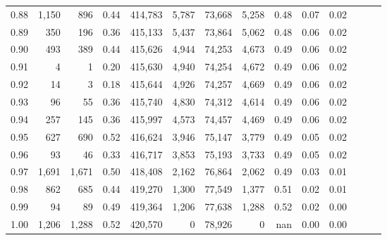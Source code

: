 \begin{tabular}{rrrrrrrrrrrrrr}
0.88 &   1,150 &    896 &  0.44 &  414,783 &    5,787 &  73,668 &   5,258 &  0.48 &  0.07 &      0.02 \\
0.89 &     350 &    196 &  0.36 &  415,133 &    5,437 &  73,864 &   5,062 &  0.48 &  0.06 &      0.02 \\
0.90 &     493 &    389 &  0.44 &  415,626 &    4,944 &  74,253 &   4,673 &  0.49 &  0.06 &      0.02 \\
0.91 &       4 &      1 &  0.20 &  415,630 &    4,940 &  74,254 &   4,672 &  0.49 &  0.06 &      0.02 \\
0.92 &      14 &      3 &  0.18 &  415,644 &    4,926 &  74,257 &   4,669 &  0.49 &  0.06 &      0.02 \\
0.93 &      96 &     55 &  0.36 &  415,740 &    4,830 &  74,312 &   4,614 &  0.49 &  0.06 &      0.02 \\
0.94 &     257 &    145 &  0.36 &  415,997 &    4,573 &  74,457 &   4,469 &  0.49 &  0.06 &      0.02 \\
0.95 &     627 &    690 &  0.52 &  416,624 &    3,946 &  75,147 &   3,779 &  0.49 &  0.05 &      0.02 \\
0.96 &      93 &     46 &  0.33 &  416,717 &    3,853 &  75,193 &   3,733 &  0.49 &  0.05 &      0.02 \\
0.97 &   1,691 &  1,671 &  0.50 &  418,408 &    2,162 &  76,864 &   2,062 &  0.49 &  0.03 &      0.01 \\
0.98 &     862 &    685 &  0.44 &  419,270 &    1,300 &  77,549 &   1,377 &  0.51 &  0.02 &      0.01 \\
0.99 &      94 &     89 &  0.49 &  419,364 &    1,206 &  77,638 &   1,288 &  0.52 &  0.02 &      0.00 \\
1.00 &   1,206 &  1,288 &  0.52 &  420,570 &        0 &  78,926 &       0 &   nan &  0.00 &      0.00 \\
\bottomrule
\end{tabular}
